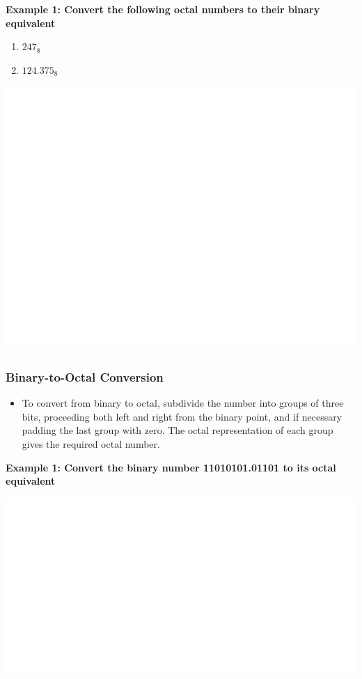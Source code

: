 \documentclass[]{book}
\providecommand{\tightlist}{%
  \setlength{\itemsep}{0pt}\setlength{\parskip}{0pt}}
\begin{document}
\textbf{Example 1: Convert the following octal numbers to their binary equivalent}

\begin{enumerate}
\def\labelenumi{(\alph{enumi})}
\tightlist
\item
  \(247_8\)
\item
  \(124.375_8\)
\end{enumerate}

\begin{center}\includegraphics[width=1\linewidth]{figure/NSbox131-1} \end{center}

\hypertarget{binary-to-octal-conversion}{%
\subsubsection{Binary-to-Octal Conversion}\label{binary-to-octal-conversion}}

\begin{itemize}
\tightlist
\item
  To convert from binary to octal, subdivide the number into groups of three bits, proceeding both left and right from the binary point, and if necessary padding the last group with zero. The octal representation of each group gives the required octal number.
\end{itemize}

\textbf{Example 1: Convert the binary number 11010101.01101 to its octal equivalent}

\begin{center}\includegraphics[width=1\linewidth]{figure/NSbox13-1} \end{center}
\end{document}
